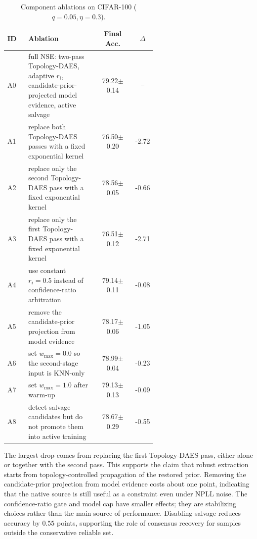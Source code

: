 \begin{table}[t]
\centering
\scriptsize
\setlength{\tabcolsep}{4pt}
\begin{tabular}{p{0.14\linewidth}|p{0.46\linewidth}|c|c}
\toprule
\textbf{ID} & \textbf{Ablation} & \textbf{Final Acc.} & \textbf{$\Delta$} \\
\midrule
\rowcolor{gray!15} A0 & full NSE: two-pass Topology-DAES, adaptive $r_i$, candidate-prior-projected model evidence, active salvage & 79.22$\pm$0.14 & -- \\
\hline
A1 & replace both Topology-DAES passes with a fixed exponential kernel & 76.50$\pm$0.20 & -2.72 \\
\hline
A2 & replace only the second Topology-DAES pass with a fixed exponential kernel & 78.56$\pm$0.05 & -0.66 \\
\hline
A3 & replace only the first Topology-DAES pass with a fixed exponential kernel & 76.51$\pm$0.12 & -2.71 \\
\hline
A4 & use constant $r_i=0.5$ instead of confidence-ratio arbitration & 79.14$\pm$0.11 & -0.08 \\
\hline
A5 & remove the candidate-prior projection from model evidence & 78.17$\pm$0.06 & -1.05 \\
\hline
A6 & set $w_{\max}=0.0$ so the second-stage input is KNN-only & 78.99$\pm$0.04 & -0.23 \\
\hline
A7 & set $w_{\max}=1.0$ after warm-up & 79.13$\pm$0.13 & -0.09 \\
\hline
A8 & detect salvage candidates but do not promote them into active training & 78.67$\pm$0.29 & -0.55 \\
\bottomrule
\end{tabular}
\caption{Component ablations on CIFAR-100 ($q=0.05,\eta=0.3$).}
\label{tab:component_ablation}
\end{table}

The largest drop comes from replacing the first Topology-DAES pass, either alone
or together with the second pass. This supports the claim that robust extraction
starts from topology-controlled propagation of the restored prior. Removing the
candidate-prior projection from model evidence costs about one point, indicating
that the native source is still useful as a constraint even under NPLL noise.
The confidence-ratio gate and model cap have smaller effects; they are
stabilizing choices rather than the main source of performance. Disabling
salvage reduces accuracy by $0.55$ points, supporting the role of consensus
recovery for samples outside the conservative reliable set.

